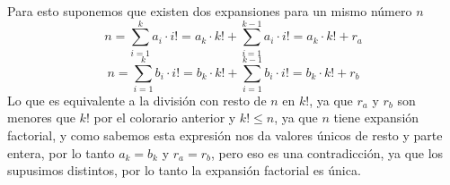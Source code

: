 \documentclass[letter]{article}
\begin{document}
\begin{pregunta}{2}
\begin{enumerate}
		Para esto suponemos que existen dos expansiones para un mismo número $n$
		$$ n = \sum_{i=1}^{k} a_{i}\cdot i!= a_k\cdot k! + \sum_{i=1}^{k-1} a_{i}\cdot i!=a_k\cdot k! + r_a$$
		$$ n =\sum_{i=1}^{k} b_{i}\cdot i!= b_k\cdot k! +\sum_{i=1}^{k-1} b_{i}\cdot i!=b_k\cdot k! + r_b$$
		Lo que es equivalente a la división con resto de $n$ en $k!$, ya que $r_a$ y $r_b$ son menores que $k!$ por el colorario anterior y $k!\leq n$, ya que $n$ tiene expansión factorial, y como sabemos esta expresión nos da valores únicos de resto y parte entera, por lo tanto $a_k = b_k$ y $r_a = r_b$, pero eso es una contradicción, ya que los supusimos distintos, por lo tanto la expansión factorial es única.
		\end{enumerate}
		
	\end{pregunta}
\end{document}
